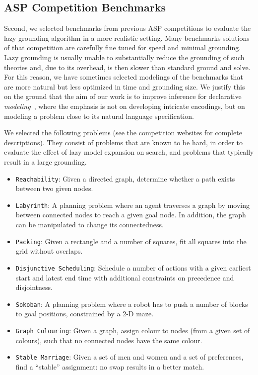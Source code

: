 \documentclass[11pt]{article}
\theoremstyle{plain}
\theoremstyle{definition}
\theoremstyle{example_basic}
\theoremstyle{example_contd}
\theoremstyle{plain}
\newcommand{\reach}				{\texttt{Reachability}\xspace}
\newcommand{\stablemarriage}	{\texttt{Stable Marriage}\xspace}
\newcommand{\colouring}			{\texttt{Graph Colouring}\xspace}
\newcommand{\packing}			{\texttt{Packing}\xspace}
\newcommand{\sokoban}			{\texttt{Sokoban}\xspace}
\newcommand{\disjsched}			{\texttt{Disjunctive Scheduling}\xspace}
\newcommand{\labyrinth}			{\texttt{Labyrinth}\xspace}
\newcommand{\change}[1]{#1}
\begin{document}
\subsection{ASP Competition Benchmarks}\label{ssec:aspcompexper}
Second, we selected benchmarks from previous ASP competitions to evaluate
the lazy grounding algorithm in a more realistic setting. \change{Many  benchmarks solutions  of that competition are carefully fine tuned for  speed and minimal   grounding.  Lazy grounding is usually unable to substantially reduce the grounding of such theories and, due to its overhead, is then slower than standard ground and solve. For this reason, we have sometimes selected  modelings of the benchmarks that are more natural but  less optimized in time and grounding size. We justify this on the ground that the aim of our work is  to improve inference for declarative \emph{modeling}~\cite{WarrenBook/DeCatBBD14}, where the  emphasis is not on developing intricate encodings, but on modeling a problem close to its natural language specification.}

We selected the following problems (see the competition websites for complete descriptions). They consist of problems that are known to be hard, in order to evaluate the effect of lazy model expansion on search, and problems that typically result in a large grounding.
\begin{itemize}
  \item \reach: Given a directed graph, determine whether a path exists between two given nodes.
  \item \labyrinth: \change{A planning problem where an agent traverses a graph by moving between connected nodes to reach a given goal node. In addition, the graph can be manipulated to change its connectedness.}
  \item \packing: Given a rectangle and a number of squares, fit all squares into the grid without overlaps.
  \item \disjsched: Schedule a number of actions with a given earliest start and latest end time with additional constraints on precedence and disjointness.
  \item \sokoban: A planning problem where a robot has to push a number of blocks to goal positions, constrained by a 2-D maze.
  \item \colouring: Given a graph, assign colour to nodes (from a given set of colours), such that no connected nodes have the same colour.
  \item \stablemarriage: Given a set of men and women and a set of
    preferences, find a ``stable'' assignment: no swap results in a better
    match.
\end{itemize}
\end{document}
